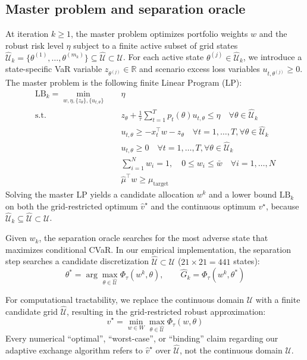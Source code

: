 \documentclass[smallcondensed]{svjour3}
\begin{document}
\subsection{Master problem and separation oracle}
At iteration $k \ge 1$, the master problem optimizes portfolio weights $w$ and the robust risk level $\eta$ subject to a finite active subset of grid states $\widehat{\mathcal{U}}_k = \{\theta^{(1)}, \dots, \theta^{(m_k)}\} \subseteq \widehat{\mathcal{U}} \subset \mathcal{U}$. For each active state $\theta^{(j)} \in \widehat{\mathcal{U}}_k$, we introduce a state-specific VaR variable $z_{\theta^{(j)}} \in \mathbb{R}$ and scenario excess loss variables $u_{t, \theta^{(j)}} \ge 0$. The master problem is the following finite Linear Program (LP):
\begin{align}
    \mathrm{LB}_k = \min_{w, \eta, \{z_\theta\}, \{u_{t,\theta}\}} \quad & \eta \\
    \text{s.t.} \quad & z_\theta + \frac{1}{\tau} \sum_{t=1}^{T} p_t(\theta) u_{t,\theta} \le \eta \quad \forall \theta \in \widehat{\mathcal{U}}_k \\
    & u_{t,\theta} \ge -x_t^\top w - z_\theta \quad \forall t=1,\dots,T, \forall \theta \in \widehat{\mathcal{U}}_k \\
    & u_{t,\theta} \ge 0 \quad \forall t=1,\dots,T, \forall \theta \in \widehat{\mathcal{U}}_k \\
    & \sum_{i=1}^N w_i = 1, \quad 0 \le w_i \le \bar{w} \quad \forall i=1,\dots,N \\
    & \hat{\mu}^\top w \ge \mu_{\text{target}}
\end{align}
Solving the master LP yields a candidate allocation $w^k$ and a lower bound $\mathrm{LB}_k$ on both the grid-restricted optimum $\widehat v^\star$ and the continuous optimum $v^\star$, because $\widehat{\mathcal{U}}_k\subseteq\widehat{\mathcal{U}}\subset\mathcal{U}$.

Given $w_k$, the separation oracle searches for the most adverse state that maximizes conditional CVaR. In our empirical implementation, the separation step searches a candidate discretization $\widehat{\mathcal{U}} \subset \mathcal{U}$ ($21\times21 = 441$ states):
\begin{equation}
    \theta^* = \arg\max_{\theta \in \widehat{\mathcal{U}}} \Phi_\tau(w^k, \theta), \qquad \widehat{G}_k = \Phi_\tau(w^k, \theta^*)
\end{equation}

For computational tractability, we replace the continuous domain $\mathcal{U}$ with a finite candidate grid $\widehat{\mathcal{U}}$, resulting in the grid-restricted robust approximation:
\begin{equation}
    \widehat{v}^\star = \min_{w \in W} \max_{\theta \in \widehat{\mathcal{U}}} \Phi_\tau(w, \theta)
\end{equation}
Every numerical ``optimal'', ``worst-case'', or ``binding'' claim regarding our adaptive exchange algorithm refers to $\widehat{v}^\star$ over $\widehat{\mathcal{U}}$, not the continuous domain $\mathcal{U}$.
\end{document}
